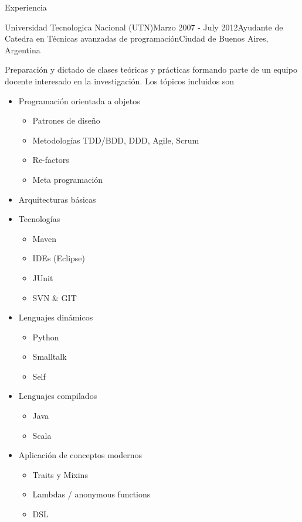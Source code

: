 \documentclass{resume} %
\begin{document}
\begin{rSection}{Experiencia}
\begin{rSubsection}{Universidad Tecnologica Nacional (UTN)}{Marzo 2007 - July 2012}{Ayudante de Catedra en T\'ecnicas avanzadas de programaci\'on}{Ciudad de Buenos Aires, Argentina}
\item Preparaci\'on y dictado de clases te\'oricas y pr\'acticas formando parte de un equipo docente interesado en la investigaci\'on. Los t\'opicos incluidos son
\begin{itemize}
	\item Programaci\'on orientada a objetos
	\begin{itemize}
		\item Patrones de dise\~no
		\item Metodolog\'ias TDD/BDD, DDD, Agile, Scrum
		\item Re-factors
		\item Meta programaci\'on
	\end{itemize}
	\item Arquitecturas b\'asicas
	\item Tecnolog\'ias 
	\begin{itemize}
		\item Maven 
		\item IDEs (Eclipse)
		\item JUnit
		\item SVN \& GIT
	\end{itemize}
	\item Lenguajes din\'amicos
	\begin{itemize}
		\item  Python
		\item  Smalltalk
		\item  Self
	\end{itemize}
	\item Lenguajes compilados
	\begin{itemize}
		\item  Java
		\item  Scala
	\end{itemize}

	\item Aplicaci\'on de conceptos modernos
	\begin{itemize}
		\item Traits y Mixins
		\item  Lambdas / anonymous functions
		\item DSL
	\end{itemize}
\end{itemize}
\end{rSubsection}


\end{rSection}
\end{document}
